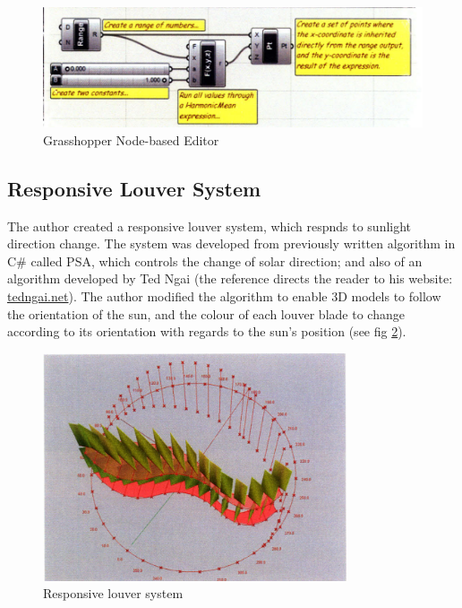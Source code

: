 \begin{figure}[h]
\centering
\includegraphics[width=\textwidth]{./Images/31-GrassGUI}
\caption[Grasshopper Node-based Editor]{Grasshopper Node-based Editor \cite{yi09}}
\label{fig:GrassGUI}
\end{figure}

\subsection{Responsive Louver System}

The author created a responsive louver system, which respnds to sunlight direction change. The system was developed from previously written algorithm in C\# called PSA, which controls the change of solar direction; and also of an algorithm developed by Ted Ngai (the reference directs the reader to his website: \url{tedngai.net}). The author modified the algorithm to enable 3D models to follow the orientation of the sun, and the colour of each louver blade to change according to its orientation with regards to the sun's position (see fig \ref{fig:RLS1}).

\begin{figure}[htbp]
\centering
\includegraphics[width=0.8\textwidth]{./Images/32-RLS1}
\caption[Responsive Louver System]{Responsive louver system \cite{yi09}}
\label{fig:RLS1}
\end{figure}

